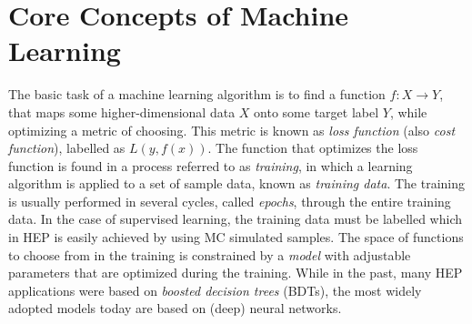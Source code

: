 


\section{Core Concepts of Machine Learning}
\label{sec:core-concepts}
The basic task of a machine learning algorithm is to find a function $f: X \rightarrow Y$, that maps some higher-dimensional data $X$ onto some target label $Y$, while optimizing a metric of choosing.
This metric is known as \emph{loss function} (also \emph{cost function}), labelled as $L(y, f(x))$.
The function that optimizes the loss function is found in a process referred to as \emph{training}, in which a learning algorithm is applied to a set of sample data, known as \emph{training data}.
The training is usually performed in several cycles, called \emph{epochs}, through the entire training data. 
In the case of supervised learning, the training data must be labelled which in HEP is easily achieved by using MC simulated samples. 
The space of functions to choose from in the training is constrained by a \emph{model} with adjustable parameters that are optimized during the training.
While in the past, many HEP applications were based on \emph{boosted decision trees} (BDTs), the most widely adopted models today are based on (deep) neural networks.


